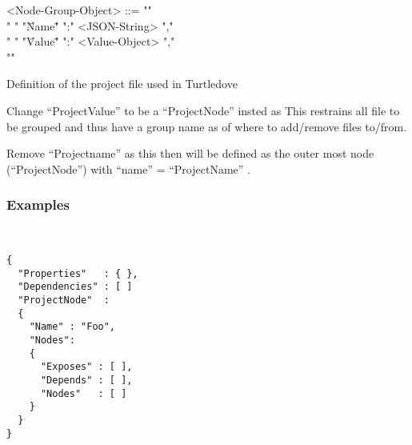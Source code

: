 \begin{nonfloatingfigure}
\begin{grammar}
<Node-Group-Object> ::= "{" \\
  "  " "\"Name\"" ":" <JSON-String> "," \\
  "  " "\"Value\"" ":" <Value-Object> "," \\
  "}"
\end{grammar}


\caption{Definition of the project file used in Turtledove}
\label{fig:protocol-project-file}
\end{nonfloatingfigure}

Change ``ProjectValue'' to be a ``ProjectNode'' insted as This restrains all
file to be grouped and thus have a group name as of where to add/remove files
to/from.

Remove ``Projectname'' as this then will be defined as the outer most node
(``ProjectNode'') with ``name'' = ``ProjectName'' .


\subsubsection{Examples}

\begin{example}\ 
\begin{lstlisting}
{
  "Properties"   : { },
  "Dependencies" : [ ]
  "ProjectNode"  :
  {
    "Name" : "Foo",
    "Nodes":
    {
      "Exposes" : [ ],
      "Depends" : [ ],
      "Nodes"   : [ ]
    }
  }
}
\end{lstlisting}

\end{example}


